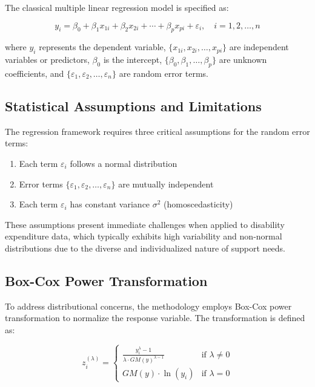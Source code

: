 The classical multiple linear regression model is specified as:

\begin{equation}
y_i = \beta_0 + \beta_1 x_{1i} + \beta_2 x_{2i} + \cdots + \beta_p x_{pi} + \varepsilon_i, \quad i = 1, 2, \ldots, n
\end{equation}

where $y_i$ represents the dependent variable, $\{x_{1i}, x_{2i}, \ldots, x_{pi}\}$ are independent variables or predictors, $\beta_0$ is the intercept, $\{\beta_0, \beta_1, \ldots, \beta_p\}$ are unknown coefficients, and $\{\varepsilon_1, \varepsilon_2, \ldots, \varepsilon_n\}$ are random error terms.

\subsection{Statistical Assumptions and Limitations}

The regression framework requires three critical assumptions for the random error terms:

\begin{enumerate}
    \item Each term $\varepsilon_i$ follows a normal distribution
    \item Error terms $\{\varepsilon_1, \varepsilon_2, \ldots, \varepsilon_n\}$ are mutually independent
    \item Each term $\varepsilon_i$ has constant variance $\sigma^2$ (homoscedasticity)
\end{enumerate}

These assumptions present immediate challenges when applied to disability expenditure data, which typically exhibits high variability and non-normal distributions due to the diverse and individualized nature of support needs.

\subsection{Box-Cox Power Transformation}

To address distributional concerns, the methodology employs Box-Cox power transformation to normalize the response variable. The transformation is defined as:

\begin{equation}
z_i^{(\lambda)} = \begin{cases}
\frac{y_i^\lambda - 1}{\lambda \cdot GM(y)^{\lambda-1}} & \text{if } \lambda \neq 0 \\
GM(y) \cdot \ln(y_i) & \text{if } \lambda = 0
\end{cases}
\end{equation}

